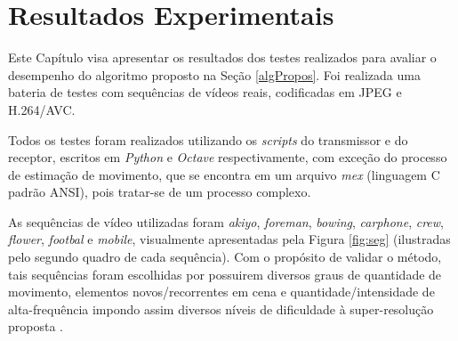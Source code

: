 \chapter[Resultados Experimentais]{Resultados Experimentais}

Este Capítulo visa apresentar os resultados dos testes realizados para avaliar o desempenho do algoritmo proposto na Seção \ref{algPropos}. Foi realizada uma bateria de testes com sequências de vídeos reais, codificadas em JPEG e H.264/AVC. 

Todos os testes foram realizados utilizando os \textit{scripts} do transmissor e do receptor, escritos em \textit{Python} e \textit{Octave} respectivamente, com exceção do processo de estimação de movimento, que se encontra em um arquivo \textit{mex} (linguagem C padrão ANSI), pois tratar-se de um processo complexo.

As sequências de vídeo utilizadas foram \textit{akiyo}, \textit{foreman}, \textit{bowing}, \textit{carphone}, \textit{crew}, \textit{flower}, \textit{footbal} e  \textit{mobile}, visualmente apresentadas pela Figura \ref{fig:seg} (ilustradas pelo segundo quadro de cada sequência). Com o propósito de validar o método, tais sequências foram escolhidas por possuirem diversos graus de quantidade de movimento, elementos novos/recorrentes em cena e quantidade/intensidade de alta-frequência impondo assim diversos níveis de dificuldade à super-resolução proposta \cite{silva2009super}.

